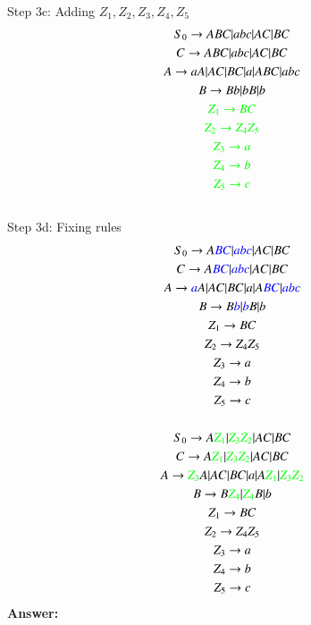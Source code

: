 \documentclass[12pt,letterpaper]{article}
\begin{document}
		\\Step 3c: Adding $Z_1,Z_2,Z_3,Z_4,Z_5$
		\begin{gather*}
			S_0 \rightarrow ABC\arrowvert abc\arrowvert AC\arrowvert BC\\
			C \rightarrow ABC\arrowvert abc\arrowvert AC\arrowvert BC\\
			A \rightarrow aA\arrowvert AC\arrowvert BC\arrowvert a\arrowvert ABC\arrowvert abc\\
			B \rightarrow Bb\arrowvert bB\arrowvert b\\
			\textcolor{green}{Z_1 \rightarrow BC}\\
			\textcolor{green}{Z_2 \rightarrow Z_4 Z_5}\\
			\textcolor{green}{Z_3 \rightarrow a}\\
			\textcolor{green}{Z_4 \rightarrow b}\\
			\textcolor{green}{Z_5 \rightarrow c}
		\end{gather*}
		\\Step 3d: Fixing rules
		\begin{gather*}
			S_0 \rightarrow A\textcolor{blue}{BC}\arrowvert \textcolor{blue}{abc}\arrowvert AC\arrowvert BC\\
			C \rightarrow A\textcolor{blue}{BC}\arrowvert \textcolor{blue}{abc}\arrowvert AC\arrowvert BC\\
			A \rightarrow \textcolor{blue}{a}A\arrowvert AC\arrowvert BC\arrowvert a\arrowvert A\textcolor{blue}{BC}\arrowvert \textcolor{blue}{abc}\\
			B \rightarrow B\textcolor{blue}{b}\arrowvert \textcolor{blue}{b}B\arrowvert b\\
			Z_1 \rightarrow BC\\
			Z_2 \rightarrow Z_4 Z_5\\
			Z_3 \rightarrow a\\
			Z_4 \rightarrow b\\
			Z_5 \rightarrow c\\
			\\S_0 \rightarrow A\textcolor{green}{Z_1}\arrowvert \textcolor{green}{Z_3 Z_2}\arrowvert AC\arrowvert BC\\
			C \rightarrow A\textcolor{green}{Z_1}\arrowvert \textcolor{green}{Z_3 Z_2}\arrowvert AC\arrowvert BC\\
			A \rightarrow \textcolor{green}{Z_3}A\arrowvert AC\arrowvert BC\arrowvert a\arrowvert A\textcolor{green}{Z_1}\arrowvert \textcolor{green}{Z_3 Z_2}\\
			B \rightarrow B\textcolor{green}{Z_4}\arrowvert \textcolor{green}{Z_4}B\arrowvert b\\
			Z_1 \rightarrow BC\\
			Z_2 \rightarrow Z_4 Z_5\\
			Z_3 \rightarrow a\\
			Z_4 \rightarrow b\\
			Z_5 \rightarrow c
		\end{gather*}
		\textbf{Answer:}\\
		
\end{document}
